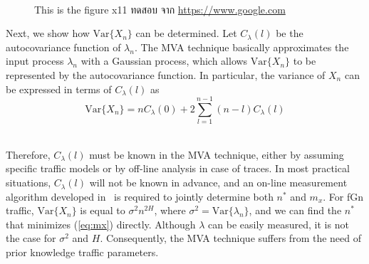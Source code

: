 \documentclass[12pt,oneside,openright,a4paper]{cpe-thai-project}
\begin{document}
 \\


\begin{figure}[!h]
  \caption{This is the figure x11 ทดสอบ จาก \href{https://www.google.com} {https://www.google.com}}\label{fig:x1}
\end{figure}

Next, we show how $\mathrm{Var}\{X_n\}$ can be determined.  Let
$C_{\lambda}(l)$ be the autocovariance function of $\lambda_n$.  The
MVA technique basically approximates the input process $\lambda_n$
with a Gaussian process, which allows $\mathrm{Var}\{X_n\}$ to be
represented by the autocovariance function.  In particular, the
variance of $X_n$ can be expressed in terms of $C_{\lambda}(l)$ as
\begin{equation}
  \mathrm{Var}\{X_n\} = nC_{\lambda}(0) + 2\sum_{l=1}^{n-1} (n-l)C_{\lambda}(l)
\end{equation}

 \\

Therefore, $C_{\lambda}(l)$ must be known in the MVA technique, either
by assuming specific traffic models or by off-line analysis in case of
traces.  In most practical situations, $C_{\lambda}(l)$ will not be
known in advance, and an on-line measurement algorithm developed
in~\cite{eun01} is required to jointly determine both $n^\ast$ and
$m_x$. For fGn traffic, $\mathrm{Var}\{X_n\}$ is equal to $\sigma^2
  n^{2H}$, where $\sigma^2 = \mathrm{Var}\{\lambda_n\}$, and we can find
the $n^\ast$ that minimizes (\ref{eq:mx}) directly. Although $\lambda$
can be easily measured, it is not the case for $\sigma^2$ and $H$.
Consequently, the MVA technique suffers from the need of prior
knowledge traffic parameters.
\end{document}

